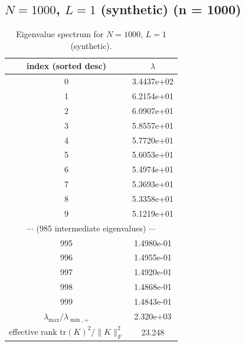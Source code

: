 \subsection*{$N=1000$, $L=1$ (synthetic) \quad (n = 1000)}
\begin{table}[H]
\centering
\caption{Eigenvalue spectrum for $N=1000$, $L=1$ (synthetic).}
\begin{tabular}{c c}
\toprule
index (sorted desc) & $\lambda$ \\
\midrule
0 & 3.4437e+02 \\
1 & 6.2154e+01 \\
2 & 6.0907e+01 \\
3 & 5.8557e+01 \\
4 & 5.7720e+01 \\
5 & 5.6053e+01 \\
6 & 5.4974e+01 \\
7 & 5.3693e+01 \\
8 & 5.3358e+01 \\
9 & 5.1219e+01 \\
\multicolumn{2}{c}{$\cdots$ (985 intermediate eigenvalues) $\cdots$} \\
995 & 1.4980e-01 \\
996 & 1.4955e-01 \\
997 & 1.4920e-01 \\
998 & 1.4868e-01 \\
999 & 1.4843e-01 \\
\midrule
$\lambda_{\max}/\lambda_{\min, +}$ & 2.320e+03 \\
effective rank $\mathrm{tr}(K)^2/\|K\|_F^2$ & 23.248 \\
\bottomrule
\end{tabular}
\end{table}

